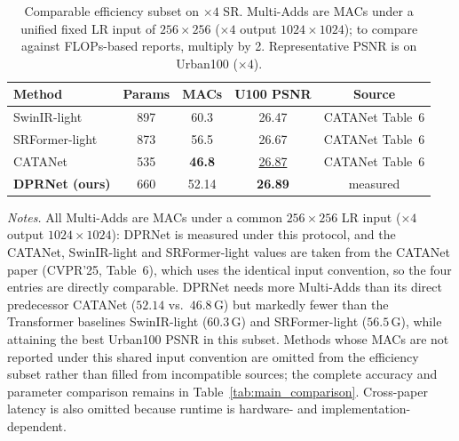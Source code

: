 \begin{table}[H]
\centering
\caption{Comparable efficiency subset on $\times 4$ SR. Multi-Adds are MACs under a unified fixed LR
input of $256\times256$ ($\times4$ output $1024\times1024$); to compare against FLOPs-based reports,
multiply by 2. Representative PSNR is on Urban100 ($\times 4$).}
\label{tab:efficiency}
\begingroup
\scriptsize
\setlength{\tabcolsep}{3pt}
\renewcommand{\arraystretch}{1.05}
\begin{tabular*}{\columnwidth}{@{\extracolsep{\fill}}lcccc}
\toprule
Method & Params & MACs & U100 PSNR & Source \\
\midrule
SwinIR-light    & 897  & 60.3  & 26.47 & CATANet Table~6 \\
SRFormer-light  & 873  & 56.5  & 26.67 & CATANet Table~6 \\
CATANet         & 535  & \textbf{46.8} & \underline{26.87} & CATANet Table~6 \\
\textbf{DPRNet (ours)} & 660 & 52.14 & \textbf{26.89} & measured \\
\bottomrule
\end{tabular*}
\endgroup

\vspace{2pt}
{\footnotesize
\textit{Notes.} All Multi-Adds are MACs under a common $256\times256$ LR input
($\times4$ output $1024\times1024$): DPRNet is measured under this protocol, and the CATANet,
SwinIR-light and SRFormer-light values are taken from the CATANet paper (CVPR'25, Table~6), which uses
the identical input convention, so the four entries are directly comparable. DPRNet
needs more Multi-Adds than its direct predecessor CATANet ($52.14$ vs.\ $46.8$\,G) but markedly fewer
than the Transformer baselines SwinIR-light ($60.3$\,G) and SRFormer-light ($56.5$\,G), while attaining
the best Urban100 PSNR in this subset. Methods whose MACs are not reported under this shared input
convention are omitted from the efficiency subset rather than filled from incompatible sources; the
complete accuracy and parameter comparison remains in Table~\ref{tab:main_comparison}. Cross-paper
latency is also omitted because runtime is hardware- and implementation-dependent.}
\end{table}

